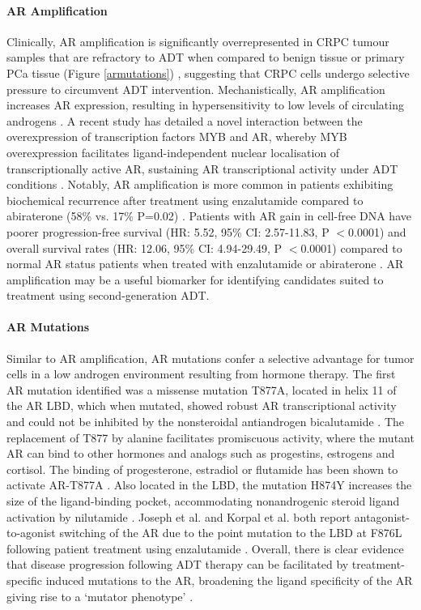 \paragraph{AR Amplification}
\noindent Clinically, AR amplification is significantly overrepresented in CRPC tumour samples that are refractory to ADT when compared to benign tissue or primary PCa tissue (Figure \ref{armutations}) \cite{Bubendorf1999Feb}, suggesting that CRPC cells undergo selective pressure to circumvent ADT intervention. Mechanistically, AR amplification increases AR expression, resulting in hypersensitivity to low levels of circulating androgens \cite{Waltering2009Oct}. A recent study has detailed a novel interaction between the overexpression of transcription factors MYB and AR, whereby MYB overexpression facilitates ligand-independent nuclear localisation of transcriptionally active AR, sustaining AR transcriptional activity under ADT conditions \cite{Srivastava2012Mar, Srivastava2021Nov}. Notably, AR amplification is more common in patients exhibiting biochemical recurrence after treatment using enzalutamide compared to abiraterone (58\% vs. 17\% P=0.02) \cite{Azad2015May}. Patients with AR gain in cell-free DNA have poorer progression-free survival (HR: 5.52, 95\% CI: 2.57-11.83, P $<$0.0001) and overall survival rates (HR: 12.06, 95\% CI: 4.94-29.49, P $<$0.0001) compared to normal AR status patients when treated with enzalutamide or abiraterone \cite{DelRe2021Jun}. AR amplification may be a useful biomarker for identifying candidates suited to treatment using second-generation ADT. \par

\paragraph{AR Mutations}
\noindent Similar to AR amplification, AR mutations confer a selective advantage for tumor cells in a low androgen environment resulting from hormone therapy. The first AR mutation identified was a missense mutation T877A, located in helix 11 of the AR LBD, which when mutated, showed robust AR transcriptional activity and could not be inhibited by the nonsteroidal antiandrogen bicalutamide \cite{Sun2006Jun}. The replacement of T877 by alanine facilitates promiscuous activity, where the mutant AR can bind to other hormones and analogs such as progestins, estrogens and cortisol. The binding of progesterone, estradiol or flutamide has been shown to activate AR-T877A \cite{Sack2001Apr}. Also located in the LBD, the mutation H874Y increases the size of the ligand-binding pocket, accommodating nonandrogenic steroid ligand activation by nilutamide \cite{Duff2005Dec}. Joseph et al. and Korpal et al. both report antagonist-to-agonist switching of the AR due to the point mutation to the LBD at F876L following patient treatment using enzalutamide \cite{Joseph2013Sep, Korpal2013Sep}. Overall, there is clear evidence that disease progression following ADT therapy can be facilitated by treatment-specific induced mutations to the AR, broadening the ligand specificity of the AR giving rise to a `mutator phenotype' \cite{Steinkamp2009Apr, Bielas2006Nov}. \par

